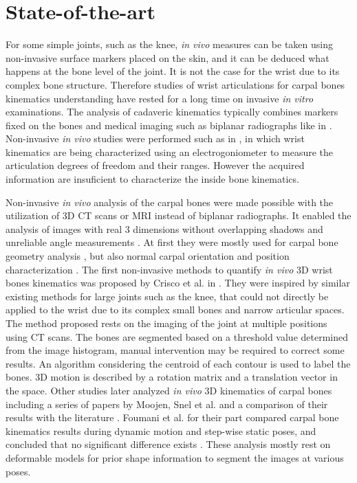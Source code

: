 \newpage
\section{State-of-the-art}
\label{sec:5_State_of_art}


For some simple joints, such as the knee, \textit{in vivo} measures can be taken using non-invasive surface markers placed on the skin, and it can be deduced what happens at the bone level of the joint. It is not the case for the wrist due to its complex bone structure. Therefore studies of wrist articulations for carpal bones kinematics understanding have rested for a long time on invasive \textit{in vitro} examinations. The analysis of cadaveric kinematics typically combines markers fixed on the bones and medical imaging such as biplanar radiographs like in \cite{ruby_1988_relative, horii_1991_kinematic}. Non-invasive \textit{in vivo} studies were performed such as in \cite{palmer_1985_functional}, in which wrist kinematics are being characterized using an electrogoniometer to measure the articulation degrees of freedom and their ranges. However the acquired information are insuficient to characterize the inside bone kinematics. 

Non-invasive \textit{in vivo} analysis of the carpal bones were made possible with the utilization of 3D CT scans or MRI instead of biplanar radiographs. It enabled the analysis of images with real 3 dimensions without overlapping shadows and unreliable angle measurements \cite{belsole_1991_carpal}. At first they were mostly used for carpal bone geometry analysis \cite{belsole_1988_mathematical, patterson_1995_carpal, viegas_1993_measurement}, but also normal carpal orientation and position characterization \cite{belsole_1991_carpal}.
The first non-invasive methods to quantify \textit{in vivo} 3D wrist bones kinematics was proposed by Crisco et al. in \cite{crisco_1999_noninvasive}. They were inspired by similar existing methods for large joints such as the knee, that could not directly be applied to the wrist due to its complex small bones and narrow articular spaces. The method proposed rests on the imaging of the joint at multiple positions using CT scans. The bones are segmented based on a threshold value determined from the image histogram, manual intervention may be required to correct some results. An algorithm considering the centroid of each contour is used to label the bones. 3D motion is described by a rotation matrix and a translation vector in the space. Other studies later analyzed \textit{in vivo} 3D kinematics of carpal bones including a series of papers by Moojen, Snel et al. \cite{snel_2000_quantitative, moojen_2001_pisiform, moojen_2002_scaphoid, moojen_2002_three} and a comparison of their results with the literature \cite{moojen_2003_vivo}. Foumani et al. for their part compared carpal bone kinematics results during dynamic motion and step-wise static poses, and concluded that no significant difference exists \cite{foumani_2009_vivo}. 
These analysis mostly rest on deformable models for prior shape information to segment the images at various poses.

